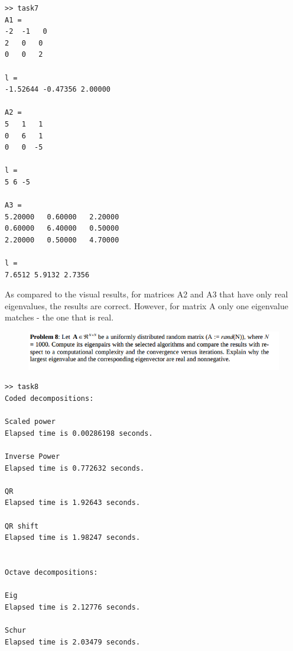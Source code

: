 \documentclass[eng,openany]{mgr}
\begin{document}
\begin{lstlisting}
>> task7
A1 =
-2  -1   0
2   0   0
0   0   2

l =
-1.52644 -0.47356 2.00000

A2 =
5   1   1
0   6   1
0   0  -5

l =
5 6 -5

A3 =
5.20000   0.60000   2.20000
0.60000   6.40000   0.50000
2.20000   0.50000   4.70000

l =
7.6512 5.9132 2.7356
\end{lstlisting}
As compared to the visual results, for matrices A2 and A3 that have only real eigenvalues, the results are correct. However, for matrix A only one eigenvalue matches - the one that is real.
\newpage
\begin{figure}[h]
\centering
\includegraphics[width=0.8\linewidth]{screenshot013}
\label{fig:screenshot013}
\end{figure}
\begin{lstlisting}
>> task8
Coded decompositions:

Scaled power
Elapsed time is 0.00286198 seconds.

Inverse Power
Elapsed time is 0.772632 seconds.

QR
Elapsed time is 1.92643 seconds.

QR shift
Elapsed time is 1.98247 seconds.


Octave decompositions:

Eig
Elapsed time is 2.12776 seconds.

Schur
Elapsed time is 2.03479 seconds.
\end{lstlisting}
\end{document}
